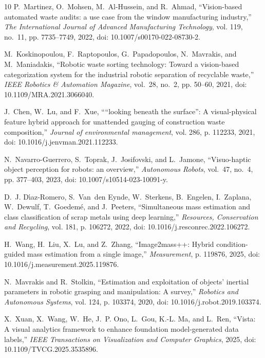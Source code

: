 \documentclass[journal,twoside,web]{ieeecolor}
\begin{document}
\begin{thebibliography}{10}
P.~Martinez, O.~Mohsen, M.~Al-Hussein, and R.~Ahmad, ``Vision-based automated
  waste audits: a use case from the window manufacturing industry,'' \emph{The
  International Journal of Advanced Manufacturing Technology}, vol. 119,
  no.~11, pp. 7735--7749, 2022, doi: 10.1007/s00170-022-08730-2.

M.~Koskinopoulou, F.~Raptopoulos, G.~Papadopoulos, N.~Mavrakis, and
  M.~Maniadakis, ``Robotic waste sorting technology: Toward a vision-based
  categorization system for the industrial robotic separation of recyclable
  waste,'' \emph{IEEE Robotics \& Automation Magazine}, vol.~28, no.~2, pp.
  50--60, 2021, doi: 10.1109/MRA.2021.3066040.

J.~Chen, W.~Lu, and F.~Xue, ``“looking beneath the surface”: A
  visual-physical feature hybrid approach for unattended gauging of
  construction waste composition,'' \emph{Journal of environmental management},
  vol. 286, p. 112233, 2021, doi: 10.1016/j.jenvman.2021.112233.

N.~Navarro-Guerrero, S.~Toprak, J.~Josifovski, and L.~Jamone, ``Visuo-haptic
  object perception for robots: an overview,'' \emph{Autonomous Robots},
  vol.~47, no.~4, pp. 377--403, 2023, doi: 10.1007/s10514-023-10091-y.

D.~J. D{\'\i}az-Romero, S.~Van~den Eynde, W.~Sterkens, B.~Engelen, I.~Zaplana,
  W.~Dewulf, T.~Goedem{\'e}, and J.~Peeters, ``Simultaneous mass estimation and
  class classification of scrap metals using deep learning,'' \emph{Resources,
  Conservation and Recycling}, vol. 181, p. 106272, 2022, doi: 10.1016/j.resconrec.2022.106272.

H.~Wang, H.~Liu, X.~Lu, and Z.~Zhang, ``Image2mass++: Hybrid condition-guided
  mass estimation from a single image,'' \emph{Measurement}, p. 119876, 2025, doi: 10.1016/j.measurement.2025.119876.

N.~Mavrakis and R.~Stolkin, ``Estimation and exploitation of objects’
  inertial parameters in robotic grasping and manipulation: A survey,''
  \emph{Robotics and Autonomous Systems}, vol. 124, p. 103374, 2020, doi: 10.1016/j.robot.2019.103374.

X.~Xuan, X.~Wang, W.~He, J.~P. Ono, L.~Gou, K.-L. Ma, and L.~Ren, ``Vista: A
  visual analytics framework to enhance foundation model-generated data
  labels,'' \emph{IEEE Transactions on Visualization and Computer Graphics},
  2025, doi: 10.1109/TVCG.2025.3535896.


\end{thebibliography}
\end{document}
